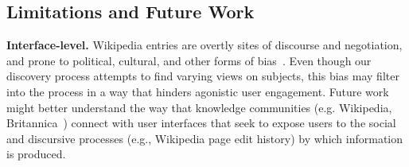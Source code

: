 

\subsection{Limitations and Future Work}



\textbf{Interface-level.}
Wikipedia entries are overtly sites of discourse and negotiation, and prone to political, cultural, and other forms of bias~\cite{hube2017bias, umarova2019partisanship}.
Even though our discovery process attempts to find varying views on subjects, this bias may filter into the process in a way that hinders agonistic user engagement.
Future work might better understand the way that knowledge communities (e.g. Wikipedia, Britannica~\cite{Greenstein2014DoEO}) connect with user interfaces that seek to expose users to the social and discursive processes (e.g., Wikipedia page edit history) by which information is produced.
